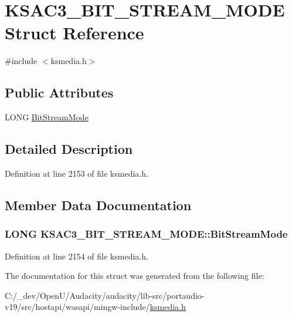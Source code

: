 \hypertarget{struct_k_s_a_c3___b_i_t___s_t_r_e_a_m___m_o_d_e}{}\section{K\+S\+A\+C3\+\_\+\+B\+I\+T\+\_\+\+S\+T\+R\+E\+A\+M\+\_\+\+M\+O\+DE Struct Reference}
\label{struct_k_s_a_c3___b_i_t___s_t_r_e_a_m___m_o_d_e}


{\ttfamily \#include $<$ksmedia.\+h$>$}

\subsection*{Public Attributes}
\begin{DoxyCompactItemize}
\item 
L\+O\+NG \hyperlink{struct_k_s_a_c3___b_i_t___s_t_r_e_a_m___m_o_d_e_a1121004c973f1231c995919d7034c54d}{Bit\+Stream\+Mode}
\end{DoxyCompactItemize}


\subsection{Detailed Description}


Definition at line 2153 of file ksmedia.\+h.



\subsection{Member Data Documentation}
\subsubsection[{\texorpdfstring{Bit\+Stream\+Mode}{BitStreamMode}}]{\setlength{\rightskip}{0pt plus 5cm}L\+O\+NG K\+S\+A\+C3\+\_\+\+B\+I\+T\+\_\+\+S\+T\+R\+E\+A\+M\+\_\+\+M\+O\+D\+E\+::\+Bit\+Stream\+Mode}\hypertarget{struct_k_s_a_c3___b_i_t___s_t_r_e_a_m___m_o_d_e_a1121004c973f1231c995919d7034c54d}{}\label{struct_k_s_a_c3___b_i_t___s_t_r_e_a_m___m_o_d_e_a1121004c973f1231c995919d7034c54d}


Definition at line 2154 of file ksmedia.\+h.



The documentation for this struct was generated from the following file\+:\begin{DoxyCompactItemize}
\item 
C\+:/\+\_\+dev/\+Open\+U/\+Audacity/audacity/lib-\/src/portaudio-\/v19/src/hostapi/wasapi/mingw-\/include/\hyperlink{ksmedia_8h}{ksmedia.\+h}\end{DoxyCompactItemize}
